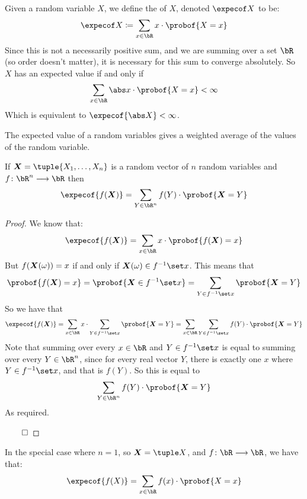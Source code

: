 \begin{defn*}

	Given a random variable $X$, we define the  of $X$, denoted $\expecof X$ to be:
	\[ \expecof X\coloneqq\sum_{x\in\bR} x\cdot\probof{X=x} \]
	Since this is not a necessarily positive sum, and we are summing over a set $\bR$ (so order doesn't matter),
	it is necessary for this sum to converge absolutely.
	So $X$ has an expected value if and only if
	\[ \sum_{x\in\bR} \abs x\cdot\probof{X=x} < \infty \]
	Which is equivalent to $\expecof{\abs X}<\infty$.

\end{defn*}

The expected value of a random variables gives a weighted average of the values of the random variable.

\begin{thrm*}

	If $\jpv=\tuple{X_1,\dots,X_n}$ is a random vector of $n$ random variables and $f\colon\bR^n\longrightarrow\bR$ then
	\[ \expecof{f(\jpv)} = \sum_{Y\in\bR^n} f(Y)\cdot\probof{\jpv=Y} \]

\end{thrm*}

\begin{proof}

	We know that:
	\[ \expecof{f(\jpv)} = \sum_{x\in\bR} x\cdot\probof{f(\jpv)=x} \]
	But $f(\boldsymbol{X}(\omega))=x$ if and only if $\jpv(\omega)\in f^{-1}\set x$.
	This means that
	\[ \probof{f(\jpv)=x} = \probof{\jpv\in f^{-1}\set x} = \sum_{Y\in f^{-1}\set x}\probof{\jpv=Y} \]
	So we have that
	\[ \expecof{f(\jpv)} = \sum_{x\in\bR} x\cdot\sum_{Y\in f^{-1}\set x}\probof{\jpv=Y} =
	\sum_{x\in\bR}\sum_{Y\in f^{-1}\set x} f(Y)\cdot\probof{\jpv=Y} \]
	Note that summing over every $x\in\bR$ and $Y\in f^{-1}\set x$ is equal to summing over every $Y\in\bR^n$, since
	for every real vector $Y$, there is exactly one $x$ where $Y\in f^{-1}\set x$, and that is $f(Y)$.
	So this is equal to
	\[ \sum_{Y\in\bR^n}f(Y)\cdot\probof{\jpv=Y} \]
	As required.

	\hfill$\qed$

\end{proof}

In the special case where $n=1$, so $\jpv=\tuple X$, and $f\colon\bR\longrightarrow\bR$, we have that:
\[ \expecof{f(X)} = \sum_{x\in\bR}f(x)\cdot\probof{X=x} \]

